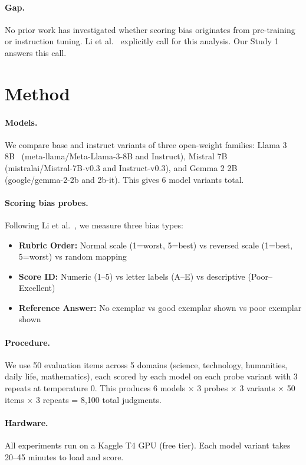\documentclass[11pt]{article}
\begin{document}
\paragraph{Gap.} No prior work has investigated whether scoring bias originates from pre-training or instruction tuning. Li et al.~\cite{li2025scoring} explicitly call for this analysis. Our Study 1 answers this call.

\section{Method}

\paragraph{Models.} We compare base and instruct variants of three open-weight families: Llama 3 8B~\cite{llama3} (meta-llama/Meta-Llama-3-8B and Instruct), Mistral 7B~\cite{mistral} (mistralai/Mistral-7B-v0.3 and Instruct-v0.3), and Gemma 2 2B~\cite{gemma2} (google/gemma-2-2b and 2b-it). This gives 6 model variants total.

\paragraph{Scoring bias probes.} Following Li et al.~\cite{li2025scoring}, we measure three bias types:
\begin{itemize}
    \item \textbf{Rubric Order:} Normal scale (1=worst, 5=best) vs reversed scale (1=best, 5=worst) vs random mapping
    \item \textbf{Score ID:} Numeric (1--5) vs letter labels (A--E) vs descriptive (Poor--Excellent)
    \item \textbf{Reference Answer:} No exemplar vs good exemplar shown vs poor exemplar shown
\end{itemize}

\paragraph{Procedure.} We use 50 evaluation items across 5 domains (science, technology, humanities, daily life, mathematics), each scored by each model on each probe variant with 3 repeats at temperature 0. This produces 6 models $\times$ 3 probes $\times$ 3 variants $\times$ 50 items $\times$ 3 repeats = 8,100 total judgments.

\paragraph{Hardware.} All experiments run on a Kaggle T4 GPU (free tier). Each model variant takes 20--45 minutes to load and score.
\end{document}
